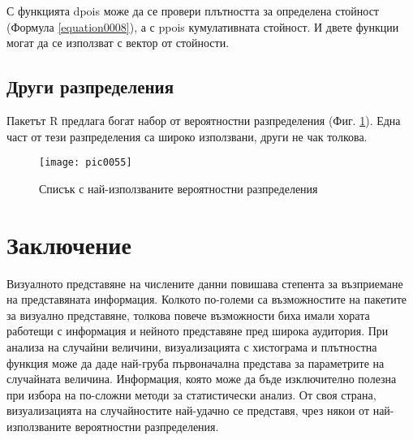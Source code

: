 С функцията dpois може да се провери плътността за определена стойност (Формула \ref{equation0008}), а с ppois кумулативната стойност. И двете функции могат да се използват с вектор от стойности. 

\subsection{Други разпределения}

Пакетът R предлага богат набор от вероятностни разпределения (Фиг. \ref{figure0055}). Една част от тези разпределения са широко използвани, други не чак толкова.

\begin{figure}[h!]
  \centering
  \texttt{[image: pic0055]}
  \caption{Списък с най-използваните вероятностни разпределения}
\label{figure0055}
\end{figure}
\FloatBarrier

\section*{Заключение}

Визуалното представяне на числените данни повишава степента за възприемане на представяната информация. Колкото по-големи са възможностите на пакетите за визуално представяне, толкова повече възможности биха имали хората работещи с информация и нейното представяне пред широка аудитория. При анализа на случайни величини, визуализацията с хистограма и плътностна функция може да даде най-груба първоначална представа за параметрите на случайната величина. Информация, която може да бъде изключително полезна при избора на по-сложни методи за статистически анализ. От своя страна, визуализацията на случайностите най-удачно се представя, чрез някои от най-използваните вероятностни разпределения. 

